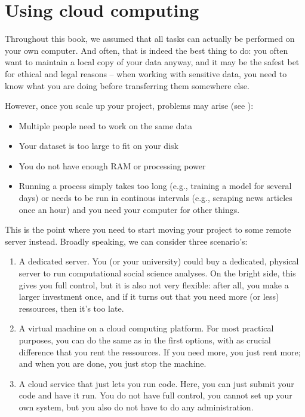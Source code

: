 \section{Using cloud computing}
\label{sec:cloudcomputing}

Throughout this book, we assumed that all tasks can actually be
performed on your own computer. And often, that is indeed the best
thing to do: you often want to maintain a local copy of your data
anyway, and it may be the safest bet for ethical and legal reasons --
when working with sensitive data, you need to know what you are doing
before transferring them somewhere else.

However, once you scale up your project, problems may arise (see \cite{Trilling2018b}):
\begin{itemize}
\item Multiple people need to work on the same data
\item Your dataset is too large to fit on your disk
\item You do not have enough RAM or processing power
\item Running a process simply takes too long (e.g., training a model
  for several days) or needs to be run in continous intervals (e.g.,
  scraping news articles once an hour) and you need your computer for
  other things.
\end{itemize}

This is the point where you need to start moving your project to some
remote server instead. Broadly speaking, we can consider three
scenario's:
\begin{enumerate}
\item A dedicated server. You (or your university) could buy a
  dedicated, physical server to run computational social science
  analyses. On the bright side, this gives you full control, but it is
  also not very flexible: after all, you make a larger investment
  once, and if it turns out that you need more (or less) ressources,
  then it's too late.
\item A virtual machine on a cloud computing platform. For most
  practical purposes, you can do the same as in the first options,
  with as crucial difference that you rent the ressources. If you need
  more, you just rent more; and when you are done, you just stop the
  machine.
\item A cloud service that just lets you run code. Here, you can just
  submit your code and have it run. You do not have full control, you
  cannot set up your own system, but you also do not have to do any
  administration.
\end{enumerate}

